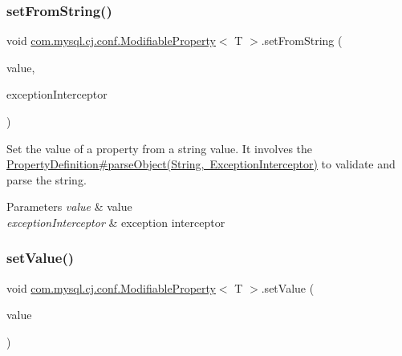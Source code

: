 \subsubsection{\texorpdfstring{set\+From\+String()}{setFromString()}}
{\footnotesize\ttfamily void \mbox{\hyperlink{interfacecom_1_1mysql_1_1cj_1_1conf_1_1_modifiable_property}{com.\+mysql.\+cj.\+conf.\+Modifiable\+Property}}$<$ T $>$.set\+From\+String (\begin{DoxyParamCaption}\item[{String}]{value,  }\item[{\mbox{\hyperlink{interfacecom_1_1mysql_1_1cj_1_1exceptions_1_1_exception_interceptor}{Exception\+Interceptor}}}]{exception\+Interceptor }\end{DoxyParamCaption})}

Set the value of a property from a string value. It involves the \mbox{\hyperlink{interfacecom_1_1mysql_1_1cj_1_1conf_1_1_property_definition_a6abfb25b6102c876eddc4f10aca5687c}{Property\+Definition\#parse\+Object(\+String, Exception\+Interceptor)}} to validate and parse the string.


\begin{DoxyParams}{Parameters}
{\em value} & value \\
\hline
{\em exception\+Interceptor} & exception interceptor \\
\hline
\end{DoxyParams}
\mbox{\label{interfacecom_1_1mysql_1_1cj_1_1conf_1_1_modifiable_property_a22d1b9332f523a15f3edf432b36e4e07}} 
\subsubsection{\texorpdfstring{set\+Value()}{setValue()}\hspace{0.1cm}{\footnotesize\ttfamily [1/2]}}
{\footnotesize\ttfamily void \mbox{\hyperlink{interfacecom_1_1mysql_1_1cj_1_1conf_1_1_modifiable_property}{com.\+mysql.\+cj.\+conf.\+Modifiable\+Property}}$<$ T $>$.set\+Value (\begin{DoxyParamCaption}\item[{T}]{value }\end{DoxyParamCaption})}

